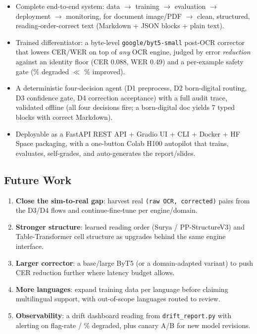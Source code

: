 \documentclass[12pt,a4paper]{article}
\begin{document}
\begin{itemize}\setlength\itemsep{0.15em}
  \item Complete end-to-end system: data $\rightarrow$ training $\rightarrow$ evaluation $\rightarrow$ deployment $\rightarrow$ monitoring, for document image/PDF $\rightarrow$ clean, structured, reading-order-correct text (Markdown + JSON blocks + plain text).
  \item Trained differentiator: a byte-level \texttt{google/byt5-small} post-OCR corrector that lowers CER/WER on top of \emph{any} OCR engine, judged by error \emph{reduction} against an identity floor (CER 0.088, WER 0.49) and a per-example safety gate (\% degraded $\ll$ \% improved).
  \item A deterministic four-decision agent (D1 preprocess, D2 born-digital routing, D3 confidence gate, D4 correction acceptance) with a full audit trace, validated offline (all four decisions fire; a born-digital doc yields 7 typed blocks with correct Markdown).
  \item Deployable as a FastAPI REST API + Gradio UI + CLI + Docker + HF Space packaging, with a one-button Colab H100 autopilot that trains, evaluates, self-grades, and auto-generates the report/slides.
\end{itemize}

\subsection{Future Work}

\begin{enumerate}\setlength\itemsep{0.1em}
  \item \textbf{Close the sim-to-real gap}: harvest real \texttt{(raw OCR, corrected)} pairs from the D3/D4 flows and continue-fine-tune per engine/domain.
  \item \textbf{Stronger structure}: learned reading order (Surya / PP-StructureV3) and Table-Transformer cell structure as upgrades behind the same engine interface.
  \item \textbf{Larger corrector}: a base/large ByT5 (or a domain-adapted variant) to push CER reduction further where latency budget allows.
  \item \textbf{More languages}: expand training data per language before claiming multilingual support, with out-of-scope languages routed to review.
  \item \textbf{Observability}: a drift dashboard reading from \texttt{drift\_report.py} with alerting on flag-rate / \% degraded, plus canary A/B for new model revisions.
\end{enumerate}
\end{document}
